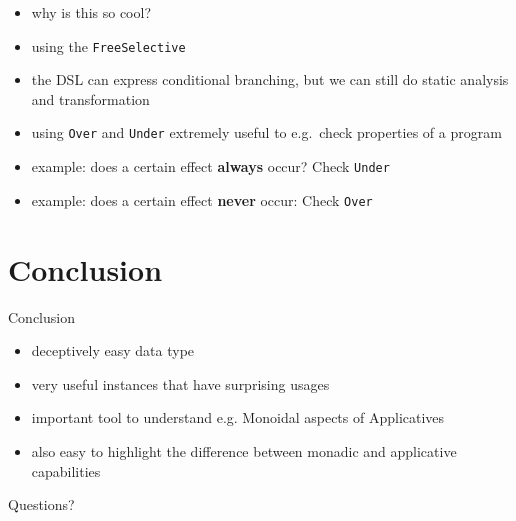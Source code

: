 \documentclass[aspectratio=169]{beamer}
\begin{document}
\begin{frame}[fragile]
  \begin{itemize}
  \item why is this so cool?
  \item using the \texttt{FreeSelective}
  \item the DSL can express conditional branching, but we can still do
    static analysis and transformation
  \item using \texttt{Over} and \texttt{Under} extremely useful to e.g.\ check properties of a program
  \item example: does a certain effect \textbf{always} occur? Check \texttt{Under}
  \item example: does a certain effect \textbf{never} occur: Check \texttt{Over}
  \end{itemize}
\end{frame}

\section{Conclusion}
\begin{frame}
  \begin{center}
    \Huge Conclusion
  \end{center}
\end{frame}

\begin{frame}
  \begin{itemize}
  \item deceptively easy data type
  \item very useful instances that have surprising usages
  \item important tool to understand e.g. Monoidal aspects of
    Applicatives
  \item also easy to highlight the difference between monadic and
    applicative capabilities
  \end{itemize}
\end{frame}

\begin{frame}
  \Huge{}
  Questions?
\end{frame}

\appendix{}
\end{document}
